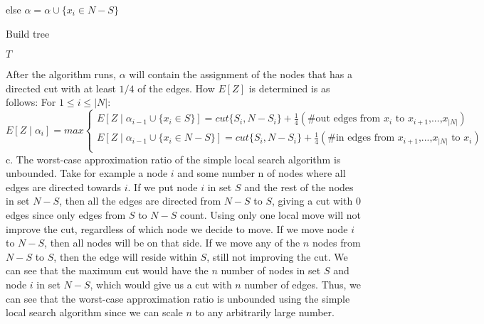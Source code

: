 \documentclass[oneside]{projectpaper} %
\begin{document}
\quad \quad else $\alpha = \alpha \cup \{x_i \in N-S\}$ \newline
\begin{algorithm}
\caption{Build tree}
\label{alg:buildtree}
\begin{algorithmic}
\ENDWHILE
\RETURN $T$
\end{algorithmic}
\end{algorithm}
After the algorithm runs, $\alpha$ will contain the assignment of the nodes that has a directed cut with at least $1/4$ of the edges. How $E[Z]$ is determined is as follows: \newline
For $1 \leq i \leq |N|$:
\begin{equation*}
  E[Z \mid \alpha_i] = max
  \begin{cases}
    E[Z \mid \alpha_{i-1} \cup \{x_i \in S\}] = cut\{S_i, N-S_i\} + \frac{1}{4}(\#\text{out edges from $x_i$ to $x_{i+1}$,...,$x_{|N|}$}) \\
    E[Z \mid \alpha_{i-1} \cup \{x_i \in N-S\}] = cut\{S_i, N-S_i\} + \frac{1}{4}(\#\text{in edges from $x_{i+1}$,...,$x_{|N|}$ to $x_i$})\\
  \end{cases}
\end{equation*}
\newline
\newline
{\large c.} The worst-case approximation ratio of the simple local search algorithm is unbounded. Take for example a node $i$ and some number n of nodes where all edges are directed towards $i$. If we put node $i$ in set $S$ and the rest of the nodes in set $N-S$, then all the edges are directed from $N-S$ to $S$, giving a cut with 0 edges since only edges from $S$ to $N-S$ count. Using only one local move will not improve the cut, regardless of which node we decide to move. If we move node $i$ to $N-S$, then all nodes will be on that side. If we move any of the $n$ nodes from $N-S$ to $S$, then the edge will reside within $S$, still not improving the cut. We can see that the maximum cut would have the $n$ number of nodes in set $S$ and node $i$ in set $N-S$, which would give us a cut with $n$ number of edges. Thus, we can see that the worst-case approximation ratio is unbounded using the simple local search algorithm since we can scale $n$ to any arbitrarily large number.
\end{document}
